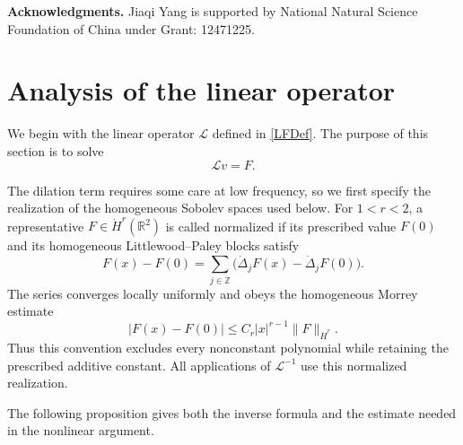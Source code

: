 \documentclass[12pt]{amsart}
\theoremstyle{remark}
\theoremstyle{definition}
\numberwithin{equation}{section}
\newcommand{\R}{\mathbb{R}}
\begin{document}
\textbf{Acknowledgments.}
Jiaqi Yang is supported by National Natural Science Foundation of China under Grant: 12471225. 
\section{Analysis of the linear operator}
\label{s:linear-similarity-operator}

We begin with the linear operator \(\mathcal L\) defined in
\eqref{LFDef}. The purpose of this section is to solve
\begin{equation} \label{LvFEqn}
  \mathcal L v = F.
\end{equation}

The dilation term requires some care at low frequency, so we first specify
the realization of the homogeneous Sobolev spaces used below.
For \(1<r<2\), a representative \(F\in\dot H^r(\R^2)\) is called normalized if its prescribed value \(F(0)\) and its homogeneous Littlewood--Paley blocks satisfy
\begin{equation}
\label{eq:normalized-representative-linear}
 F(x)-F(0)=\sum_{j\in\mathbb Z}\bigl(\dot\Delta_jF(x)-\dot\Delta_jF(0)\bigr).
\end{equation}
The series converges locally uniformly and obeys the homogeneous Morrey estimate
\begin{equation}
\label{eq:normalized-Morrey-linear}
 |F(x)-F(0)|\leq C_r|x|^{r-1}\|F\|_{\dot H^r}.
\end{equation}
Thus this convention excludes every nonconstant polynomial while retaining the prescribed additive constant.
All applications of \(\mathcal L^{-1}\) use this normalized realization.

The following proposition gives both the inverse formula and the estimate
needed in the nonlinear argument.
\end{document}
